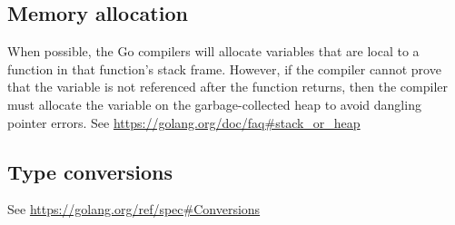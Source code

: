 \documentclass{article}
\begin{document}
	\subsection{Memory allocation}
		When possible, the Go compilers will allocate variables that are local to a function in that function's stack frame. However, if the compiler cannot prove that the variable is not referenced after the function returns, then the compiler must allocate the variable on the garbage-collected heap to avoid dangling pointer errors. See \url{https://golang.org/doc/faq#stack_or_heap}
		
	\subsection{Type conversions}
		See \url{https://golang.org/ref/spec#Conversions}
\end{document}
